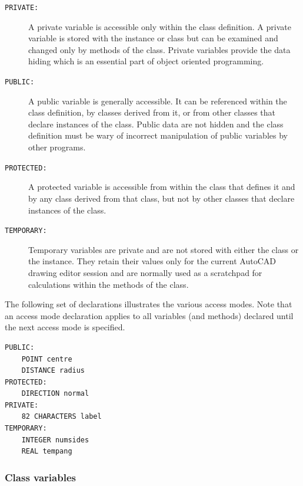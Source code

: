 \documentclass{article}
\begin{document}
\begin{description}
\item[{\tt PRIVATE:}]   A private variable is accessible only within
                        the class definition.  A private variable is
                        stored with the instance or class but can be
                        examined and changed only by methods of
                        the class.  Private variables provide the
                        data hiding which is an essential part of
                        object oriented programming.
\item[{\tt PUBLIC:}]    A public variable is generally accessible.
                        It can be referenced within the class
                        definition, by classes derived from it, or
                        from other classes that declare instances of
                        the class.  Public data are not hidden and the
                        class definition must be wary of incorrect
                        manipulation of public variables by other
                        programs.
\item[{\tt PROTECTED:}] A protected variable is accessible from within
                        the class that defines it and by any class
                        derived from that class, but not by other
                        classes that declare instances of the class.
\item[{\tt TEMPORARY:}] Temporary variables are private and are
                        not stored with either the class or the
                        instance.  They retain their values only for
                        the current AutoCAD drawing editor session and
                        are normally used as a scratchpad for
                        calculations within the methods of the class.
\end{description}

The following set of declarations illustrates the various access
modes.  Note that an access mode declaration applies to all variables
(and methods) declared until the next access mode is specified.

\begin{verbatim}
PUBLIC:
    POINT centre
    DISTANCE radius
PROTECTED:
    DIRECTION normal
PRIVATE:
    82 CHARACTERS label
TEMPORARY:
    INTEGER numsides
    REAL tempang
\end{verbatim}

\subsubsection{Class variables}
\end{document}
